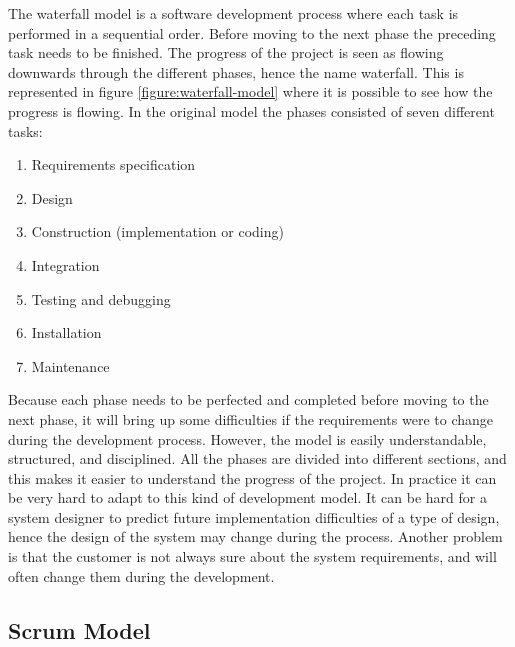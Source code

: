 The waterfall model is a software development process where each task is performed in a sequential order.
Before moving to the next phase the preceding task needs to be finished.
The progress of the project is seen as flowing downwards through the different phases, hence the name waterfall.
This is represented in figure \ref{figure:waterfall-model} where it is possible to see how the progress is flowing.
In the original model the phases consisted of seven different tasks:


\begin{enumerate}
\item Requirements specification
\item Design
\item Construction (implementation or coding)
\item Integration
\item Testing and debugging
\item Installation
\item Maintenance
\end{enumerate}

Because each phase needs to be perfected and completed before moving to the next phase, it will bring up some difficulties if the requirements were to change during the development process. 
However, the model is easily understandable, structured, and disciplined. 
All the phases are divided into different sections, and this makes it easier to understand the progress of the project.
In practice it can be very hard to adapt to this kind of development model. 
It can be hard for a system designer to predict future implementation difficulties of a type of design, hence the design of the system may change during the process.
Another problem is that the customer is not always sure about the system requirements, and will often change them during the development.

\subsection{Scrum Model \cite{Compendium}}

